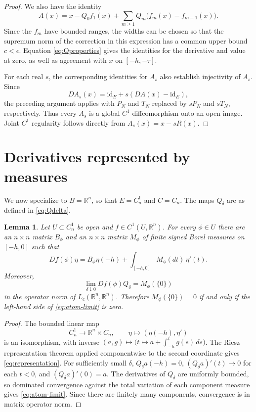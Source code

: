 \documentclass[11pt]{article}
\newtheorem{lemma}[theorem]{Lemma}
\newcommand{\Lc}{L_c}
\newcommand{\id}{\mathrm{id}}
\begin{document}
\begin{proof}
We also have the identity
\begin{equation}\label{eq:telA}
A(x)=x-Q_0f_1(x)
+\sum_{m\ge1}
Q_m\bigl(f_m(x)-f_{m+1}(x)\bigr).
\end{equation}
Since the $f_m$ have bounded ranges,
the widths can be chosen so that the
supremum norm of the correction in this
expression has a common upper bound
$c<\epsilon$. Equation
\eqref{eq:Qproperties} gives the identities
for the derivative and value at zero,
as well as agreement with $x$ on
$[-h,-\tau]$.

For each real $s$, the corresponding identities for $A_s$
also establish injectivity of $A_s$.
Since
\[
DA_s(x)=\id_E+s(DA(x)-\id_E),
\]
the preceding argument applies with
$P_N$ and $T_N$ replaced by $sP_N$
and $sT_N$, respectively. Thus every
$A_s$ is a global $C^1$ diffeomorphism
onto an open image. Joint $C^1$
regularity follows directly from
$A_s(x)=x-sR(x)$.
\end{proof}


\section{Derivatives represented by measures}

We now specialize to $B=\mathbb R^n$, so that
$E=C_n^1$ and $C=C_n$. The maps $Q_\delta$
are as defined in \eqref{eq:Qdelta}.

\begin{lemma}\label{lem:measures}
Let $U\subset C_n^1$ be open and
$f\in C^1(U,\mathbb R^n)$. For every $\phi\in U$ there are an $n\times n$ matrix $B_\phi$ and an $n\times n$ matrix $M_\phi$ of finite signed Borel measures on $[-h,0]$ such that
\begin{equation}\label{eq:representation}
 Df(\phi)\eta=B_\phi\eta(-h)+\int_{[-h,0]}M_\phi(dt)\,\eta'(t).
\end{equation}
Moreover,
\begin{equation}\label{eq:atom-limit}
 \lim_{\delta\downarrow0}Df(\phi)Q_\delta=M_\phi(\{0\})
\end{equation}
in the operator norm of $\Lc(\mathbb R^n,\mathbb R^n)$. Therefore $M_\phi(\{0\})=0$ if and only if the left-hand side of \eqref{eq:atom-limit} is zero.
\end{lemma}
\begin{proof}
The bounded linear map
\[
 C_n^1\longrightarrow\mathbb R^n\times C_n,\qquad
 \eta\longmapsto(\eta(-h),\eta')
\]
is an isomorphism, with inverse $(a,g)\mapsto\bigl(t\mapsto a+\int_{-h}^tg(s)\,ds\bigr)$. The Riesz representation theorem applied componentwise to the second coordinate gives \eqref{eq:representation}. For sufficiently small $\delta$, $Q_\delta a(-h)=0$, $(Q_\delta a)'(t)\to0$ for each $t<0$, and $(Q_\delta a)'(0)=a$. The derivatives of $Q_\delta$ are uniformly bounded, so dominated convergence against the total variation of each component measure gives \eqref{eq:atom-limit}. Since there are finitely many components, convergence is in matrix operator norm.
\end{proof}
\end{document}
